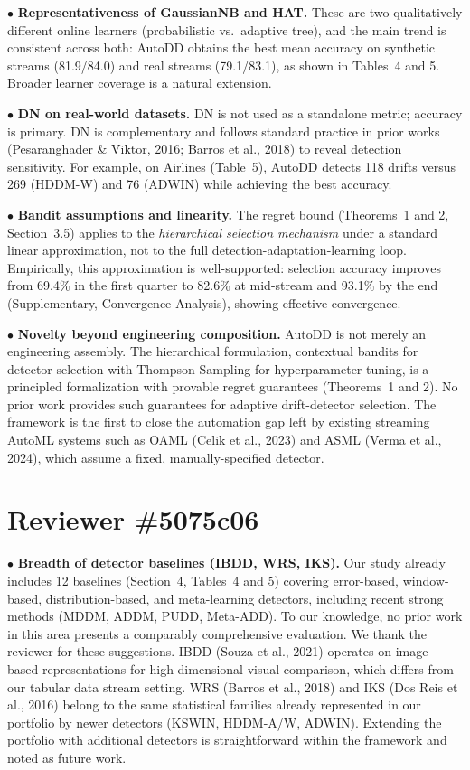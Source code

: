 \documentclass{article}
\begin{document}
\noindent$\bullet$ \textbf{Representativeness of GaussianNB and HAT.}
These are two qualitatively different online learners (probabilistic vs.\ adaptive tree), and the main trend is consistent across both: AutoDD obtains the best mean accuracy on synthetic streams (81.9/84.0) and real streams (79.1/83.1), as shown in Tables~4 and 5. Broader learner coverage is a natural extension.

\noindent$\bullet$ \textbf{DN on real-world datasets.}
DN is not used as a standalone metric; accuracy is primary. DN is complementary and follows standard practice in prior works (Pesaranghader \& Viktor, 2016; Barros et al., 2018) to reveal detection sensitivity. For example, on Airlines (Table~5), AutoDD detects 118 drifts versus 269 (HDDM-W) and 76 (ADWIN) while achieving the best accuracy.

\noindent$\bullet$ \textbf{Bandit assumptions and linearity.}
The regret bound (Theorems~1 and 2, Section~3.5) applies to the \emph{hierarchical selection mechanism} under a standard linear approximation, not to the full detection-adaptation-learning loop. Empirically, this approximation is well-supported: selection accuracy improves from 69.4\% in the first quarter to 82.6\% at mid-stream and 93.1\% by the end (Supplementary, Convergence Analysis), showing effective convergence.

\noindent$\bullet$ \textbf{Novelty beyond engineering composition.}
AutoDD is not merely an engineering assembly. The hierarchical formulation, contextual bandits for detector selection with Thompson Sampling for hyperparameter tuning, is a principled formalization with provable regret guarantees (Theorems~1 and 2). No prior work provides such guarantees for adaptive drift-detector selection. The framework is the first to close the automation gap left by existing streaming AutoML systems such as OAML (Celik et al., 2023) and ASML (Verma et al., 2024), which assume a fixed, manually-specified detector.

\section*{Reviewer \#5075c06}

\noindent$\bullet$ \textbf{Breadth of detector baselines (IBDD, WRS, IKS).}
Our study already includes 12 baselines (Section~4, Tables~4 and 5) covering error-based, window-based, distribution-based, and meta-learning detectors, including recent strong methods (MDDM, ADDM, PUDD, Meta-ADD). To our knowledge, no prior work in this area presents a comparably comprehensive evaluation. We thank the reviewer for these suggestions. IBDD (Souza et al., 2021) operates on image-based representations for high-dimensional visual comparison, which differs from our tabular data stream setting. WRS (Barros et al., 2018) and IKS (Dos Reis et al., 2016) belong to the same statistical families already represented in our portfolio by newer detectors (KSWIN, HDDM-A/W, ADWIN). Extending the portfolio with additional detectors is straightforward within the framework and noted as future work.
\end{document}
